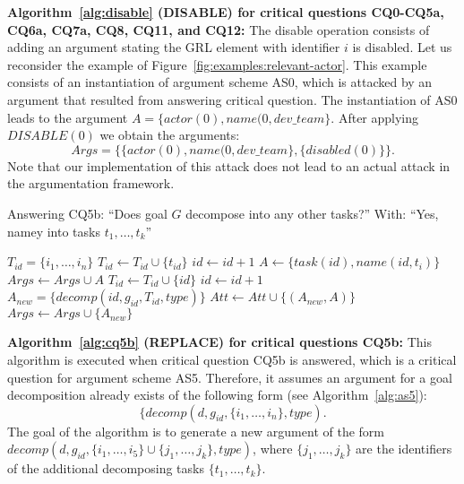\noindent\textbf{Algorithm~\ref{alg:disable} (\textsf{DISABLE}) for critical questions CQ0-CQ5a, CQ6a, CQ7a, CQ8, CQ11, and CQ12:} 
The disable operation consists of adding an argument stating the GRL element with identifier $i$ is disabled. Let us reconsider the example of Figure~\ref{fig:examples:relevant-actor}. This example consists of an instantiation of argument scheme AS0, which is attacked by an argument that resulted from answering critical question. The instantiation of AS0 leads to the argument $A=\{actor(0),name(0,dev\_team\}$. After applying $DISABLE(0)$ we obtain the arguments: $$Args=\{\{actor(0),name(0,dev\_team\}, \{disabled(0)\}\}.$$ Note that our implementation of this attack does not lead to an actual attack in the argumentation framework.
\begin{algorithm}[h]
  \caption{Answering CQ5b: ``Does goal $G$ decompose into any other tasks?'' With: ``Yes, namey into tasks $t_1,\ldots,t_k$''}\label{alg:cq5b}
  \begin{algorithmic}[1]
    \State $T_{id} = \{i_1,\ldots,i_n\}$
    \label{alg:cq5b:for1}
        \State $T_{id} \gets T_{id} \cup \{t_{id}\}$
      \Else
        \State $id\gets id+1$
        \State $A \gets \{task(id),name(id,t_i)\}$
        \State $Args \gets Args\cup A$
        \State $T_{id} \gets T_{id} \cup \{id\}$
      \EndIf
    \EndFor
    \State $id\gets id+1$
    \State $A_{new} = \{decomp(id, g_{id}, T_{id}, type)\}$\label{alg:cq5b:newarg}
    \label{alg:cq5b:for2}
      \State $Att\gets Att \cup \{(A_{new},A)\}$
    \EndFor
    \State $Args \gets Args \cup \{A_{new}\}$
    \EndProcedure
  \end{algorithmic}
\end{algorithm}

\noindent\textbf{Algorithm~\ref{alg:cq5b} (\textsf{REPLACE}) for critical questions CQ5b:}  This algorithm is executed when critical question CQ5b is answered, which is a critical question for argument scheme AS5. Therefore, it assumes an argument for a goal decomposition already exists of the following form (see Algorithm~\ref{alg:as5}): $$\{decomp(d, g_{id}, \{i_1,\ldots,i_n\},type).$$  The goal of the algorithm is to generate a new argument of the form $decomp(d, g_{id}, \{i_1,\ldots,i_5\}\cup \{j_1,\ldots,j_k\}, type)$, where $\{j_1,\ldots,j_k\}$ are the identifiers of the additional decomposing tasks $\{t_1,\ldots,t_k\}$.

